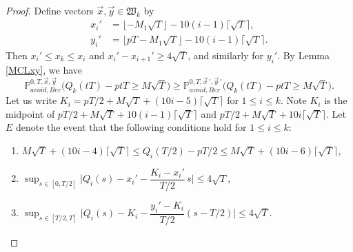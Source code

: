 \begin{proof}
	Define vectors $\vec{x},\vec{y}\in\mathfrak{W}_k$ by
	\begin{align*}
	x_i' &= \lfloor - M_1\sqrt{T} \rfloor - 10(i-1)\lceil\sqrt{T}\rceil,\\
	y_i' &= \lfloor pT - M_1\sqrt{T}\rfloor - 10(i-1)\lceil\sqrt{T}\rceil.
	\end{align*}
	Then $x_i'\leq x_k \leq x_i$ and $x_i'-x_{i+1}'\geq 4\sqrt{T}$, and similarly for $y_i'$. By Lemma \ref{MCLxy}, we have
	\begin{equation*}
	\mathbb{P}^{0,T,\vec{x},\vec{y}}_{avoid, Ber} \Big(Q_k(tT) - ptT \geq M\sqrt{T}\Big) \geq \mathbb{P}^{0,T,\vec{x}\,',\vec{y}\,'}_{avoid, Ber} \Big(Q_k(tT) - ptT \geq M\sqrt{T}\Big).
	\end{equation*}
	Let us write $K_i = pT/2 + M\sqrt{T}+(10i-5)\lceil\sqrt{T}\rceil$ for $1\leq i\leq k$. Note $K_i$ is the midpoint of $pT/2 + M\sqrt{T} + 10(i-1)\lceil\sqrt{T}\rceil$ and $pT/2 + M\sqrt{T}+10i\lceil\sqrt{T}\rceil$. Let $E$ denote the event that the following conditions hold for $1\leq i\leq k$:
	\begin{enumerate}[label=(\arabic*)]
		
		\item $M\sqrt{T}+(10i-4)\lceil\sqrt{T}\rceil \leq Q_i(T/2) - pT/2 \leq M\sqrt{T} + (10i-6)\lceil\sqrt{T}\rceil$,
		
		\item $\sup_{s\in[0,T/2]} \Big|Q_i(s)-x_i'-\dfrac{K_i-x_i'}{T/2}\,s\Big| \leq 4\sqrt{T}$,
		
		\item $\sup_{s\in[T/2,T]} \Big|Q_i(s)-K_i-\dfrac{y_i'-K_i}{T/2}(s-T/2)\Big| \leq 4\sqrt{T}$.
		

\end{enumerate}
\end{proof}

